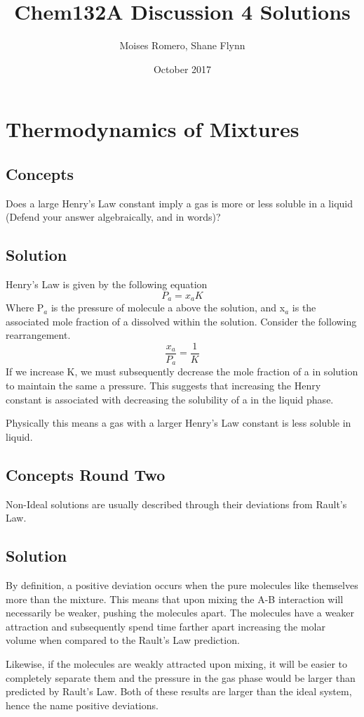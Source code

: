 \documentclass{article}
\title{Chem132A Discussion 4 Solutions}
\author{Moises Romero, Shane Flynn}
\date{October 2017}
\newcommand{\be}{\begin{equation}}
\newcommand{\ee}{\end{equation}}
\begin{document}
\maketitle

\section{Thermodynamics of Mixtures}

\subsection{Concepts}
Does a large Henry's Law constant imply a gas is more or less soluble in a liquid (Defend your answer algebraically, and in words)?

\subsection*{Solution}
Henry's Law is given by the following equation
\be
P_a = x_a K
\ee
Where P$_a$ is the pressure of molecule a above the solution, and x$_a$ is the associated mole fraction of a dissolved within the solution.
Consider the following rearrangement. 
\be
\frac{x_a}{P_a} = \frac{1}{K}
\ee
If we increase K, we must subsequently decrease the mole fraction of a in solution to maintain the same a pressure.
This suggests that increasing the Henry constant is associated with decreasing the solubility of a in the liquid phase. 

Physically this means a gas with a larger Henry's Law constant is less soluble in liquid. 

\subsection{Concepts Round Two}
Non-Ideal solutions are usually described through their deviations from Rault's Law. 

\subsection*{Solution}
By definition, a positive deviation occurs when the pure molecules like themselves more than the mixture. 
This means that upon mixing the A-B interaction will necessarily be weaker, pushing the molecules apart. 
The molecules have a weaker attraction and subsequently spend time farther apart increasing the molar volume when compared to the Rault's Law prediction. 

Likewise, if the molecules are weakly attracted upon mixing, it will be easier to completely separate them and the pressure in the gas phase would be larger than predicted by Rault's Law. 
Both of these results are larger than the ideal system, hence the name positive deviations. 
\end{document}

